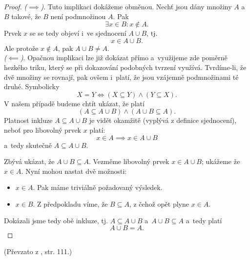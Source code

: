 \begin{proof}
    \textit{($\implies$)}. Tuto implikaci dokážeme obměnou. Nechť jsou dány množiny $A$ a~$B$ takové, že $B$ není podmnožinou $A$. Pak
    \begin{equation*}
        \exists x\in B : x\notin A.
    \end{equation*}
    Prvek $x$ se se tedy objeví i~ve sjednocení $A \cup B$, tj.
    \begin{equation*}
        x\in A \cup B.
    \end{equation*}
    Ale protože $x\notin A$, pak $A \cup B \neq A$.\\
    \textit{($\impliedby$)}. Opačnou implikaci lze již dokázat přímo a~využijeme zde poměrně hezkého triku, který se při dokazování podobných tvrzení využívá. Tvrdíme-li, že dvě množiny se rovnají, pak ovšem i~platí, že jsou vzájemně podmnožinami té druhé. Symbolicky
    \begin{equation*}
        X = Y \iff (X \subseteq Y) \land (Y \subseteq X).
    \end{equation*}
    V našem případě budeme chtít ukázat, že platí
    \begin{equation*}
        (A \subseteq A \cup B) \land (A \cup B \subseteq A).
    \end{equation*}
    Platnost inkluze $A \subseteq A \cup B$ je vidět okamžitě (vyplývá z definice sjednocení), neboť pro libovolný prvek $x$ platí:
    \begin{equation*}
        x \in A \implies x \in A \cup B
    \end{equation*}
    a~tedy skutečně $A \subseteq A \cup B$.\par
    Zbývá ukázat, že $A \cup B \subseteq A$. Vezměme libovolný prvek $x \in A \cup B$; ukážeme že $x\in A$. Nyní mohou nastat dvě možnosti:
    \begin{itemize}
        \item $x \in A$. Pak máme triviálně požadovaný výsledek.
        \item $x \in B$. Z předpokladu víme, že $B \subseteq A$, z čehož opět plyne $x\in A$.
    \end{itemize}
    Dokázali jsme tedy obě inkluze, tj. $A \subseteq A \cup B$ a~$A \cup B \subseteq A$ a~tedy platí
    \begin{equation*}
        A \cup B = A.
    \end{equation*}
\end{proof}
(Převzato z \cite{ChartrandPolimeniZhang2014}, str. 111.)
